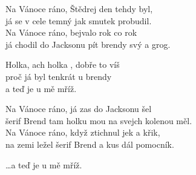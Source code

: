 
\ve{}
Na Vánoce ráno, Štědrej den tehdy byl,\\
já se v cele temný jak smutek probudil.\\
Na Vánoce ráno, bejvalo rok co rok\\
já chodil do Jacksonu pít brendy svý a grog.

\cho{}
Holka, ach holka , dobře to víš\\
proč já byl tenkrát u brendy\\
a teď je u mě mříž.

\ve{}
Na Vánoce ráno, já zas do Jacksonu šel\\
šerif Brend tam holku mou na svejch kolenou měl.\\
Na Vánoce ráno, když ztichnul jek a křik,\\
na zemi ležel šerif Brend a kus dál pomocník.

\cho{}

\cho{}
\ldots{}a teď je u mě mříž.

\esong{}